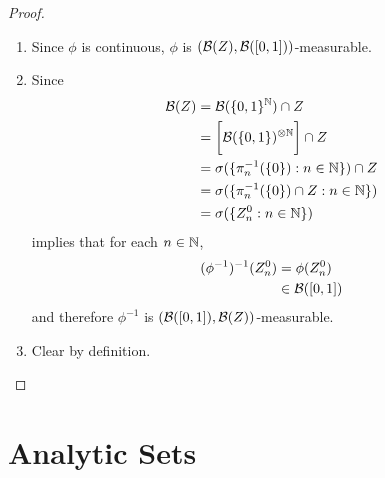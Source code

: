 \documentclass{book}
\begin{document}
	\begin{proof}\
		\begin{enumerate}
			\item Since $\phi$ is continuous, $\phi$ is $(\mathcal{B}(Z), \mathcal{B}([0,1]))$-measurable. \\
			\item Since 
			\begin{align*}
				\mathcal{B}(Z) 
				& = \mathcal{B}(\{0, 1\}^{\mathbb{N}}) \cap Z \\
				& = \bigg[ \mathcal{B}(\{0,1\})^{\otimes \mathbb{N}} \bigg] \cap Z \\
				& = \sigma(\{\pi_n^{-1}(\{0\}): n \in \mathbb{N}\}) \cap Z \\
				& = \sigma (\{\pi_n^{-1}(\{0\}) \cap Z: n \in \mathbb{N}\} )\\
				& = \sigma (\{Z_n^0: n \in \mathbb{N}\})
			\end{align*}
			 implies that for each $n \in \mathbb{N}$, 
			\begin{align*}
				(\phi^{-1})^{-1} (Z_n^0) 
				& = \phi(Z_n^0) \\
				& \in \mathcal{B}([0,1]) \\
			\end{align*}
			and therefore $\phi^{-1}$ is $(\mathcal{B}([0,1]), \mathcal{B}(Z))$-measurable.
			\item Clear by definition.
		\end{enumerate}
	\end{proof}
	
	
	
	
	
	
	
	
	
	








































	\newpage
	\section{Analytic Sets}
	
\end{document}

